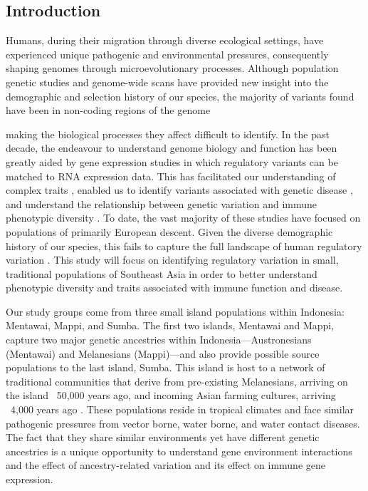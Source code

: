 \documentclass[12pt,a4paper,titlepage,twoside,openright]{book}
\begin{document}
\begin{mainmatter}
\mainmatterheadings

\chapter{Introduction}\label{}
Humans, during their migration through diverse ecological settings, have experienced unique pathogenic and environmental pressures, consequently shaping genomes through microevolutionary processes. Although population genetic studies and genome-wide scans have provided new insight into the demographic and selection history of our species, the majority of variants found have been in non-coding regions of the genome {\cite{albert2015role, zappala2016non, pala2017population} making the biological processes they affect difficult to identify. In the past decade, the endeavour to understand genome biology and function has been greatly aided by gene expression studies in which regulatory variants can be matched to RNA expression data. This has facilitated our understanding of complex traits \cite{cookson2009mapping, albert2015role}, enabled us to identify variants associated with genetic disease \cite{kremer2017genetic}, and understand the relationship between genetic variation and immune phenotypic diversity \cite{gupta2014transcriptome,chen2016genetic}. To date, the vast majority of these studies have focused on populations of primarily European descent. Given the diverse demographic history of our species, this fails to capture the full landscape of human regulatory variation \cite{quach2016genetic, martin2017human}. This study will focus on identifying regulatory variation in small, traditional populations of Southeast Asia in order to better understand phenotypic diversity and traits associated with immune function and disease. 

Our study groups come from three small island populations within Indonesia: Mentawai, Mappi, and Sumba. The first two islands, Mentawai and Mappi, capture two major genetic ancestries within Indonesia---Austronesians (Mentawai) and Melanesians (Mappi)---and also provide possible source populations to the last island, Sumba. This island is host to a network of traditional communities that derive from pre-existing Melanesians, arriving on the island ~50,000 years ago, and incoming Asian farming cultures, arriving ~4,000 years ago \cite{cox2016small}. These populations reside in tropical climates and face similar pathogenic pressures from vector borne, water borne, and water contact diseases. The fact that they share similar environments yet have different genetic ancestries is a unique opportunity to understand gene environment interactions and the effect of ancestry-related variation and its effect on immune gene expression.

}
\end{mainmatter}
\end{document}
